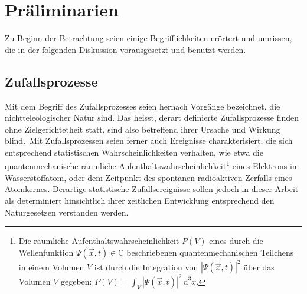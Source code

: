 \documentclass[a4paper,11pt]{article}
\numberwithin{equation}{section}
\begin{document}
\section{Präliminarien}
Zu Beginn der Betrachtung seien einige Begrifflichkeiten erörtert und umrissen, die in der folgenden Diskussion vorausgesetzt und benutzt werden.

\subsection{Zufallsprozesse}
Mit dem Begriff des Zufallsprozesses seien hernach Vorgänge bezeichnet, die nichtteleologischer Natur sind. Das heisst, derart definierte Zufallsprozesse finden ohne Zielgerichtetheit statt, sind also betreffend ihrer Ursache und Wirkung \flqq blind\frqq.\ Mit Zufallsprozessen seien ferner auch Ereignisse charakterisiert, die sich entsprechend statistischen Wahrscheinlichkeiten verhalten, wie etwa die quantenmechanische räumliche Aufenthaltswahrscheinlichkeit\footnote{Die räumliche Aufenthaltswahrscheinlichkeit $P(V)$ eines durch die Wellenfunktion $\Psi(\vec{x},t) \in \mathbb{C}$ beschriebenen quantenmechanischen Teilchens in einem Volumen $V$ ist durch die Integration von $|\Psi(\vec{x},t)|^2$ über das Volumen $V$ gegeben: $P(V) = \int_V |\Psi(\vec{x},t)|^2\,\mathrm{d}^3x.$} eines Elektrons im Wasserstoffatom, oder dem Zeitpunkt des spontanen radioaktiven Zerfalls eines Atomkernes. Derartige statistische Zufallsereignisse sollen jedoch in dieser Arbeit als determiniert hinsichtlich ihrer zeitlichen Entwicklung entsprechend den Naturgesetzen verstanden werden.
\end{document}
